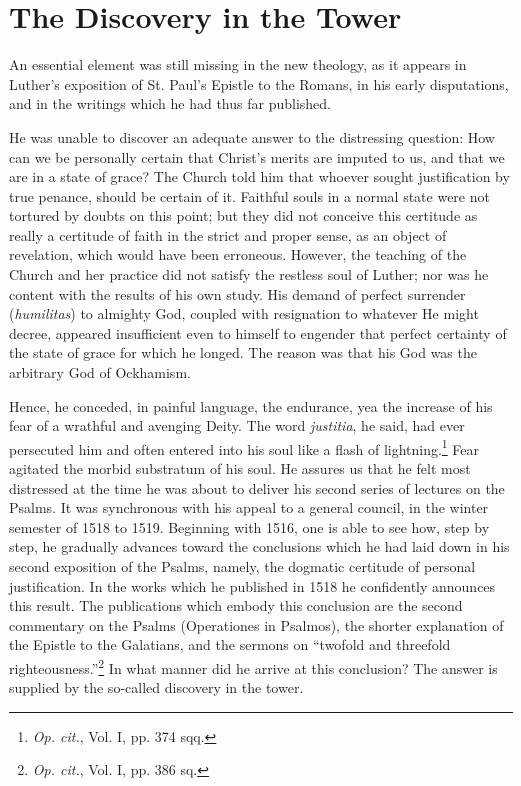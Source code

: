 \section{The Discovery in the Tower}

An essential element was still missing in the new theology, as it
appears in Luther’s exposition of St. Paul’s Epistle to the Romans, in
his early disputations, and in the writings which he had thus far published.

He was unable to discover an adequate answer to the distressing
question: How can we be personally certain that Christ’s merits are
imputed to us, and that we are in a state of grace? The Church told
him that whoever sought justification by true penance, should be
certain of it. Faithful souls in a normal state were not tortured by
doubts on this point; but they did not conceive this certitude as
really a certitude of faith in the strict and proper sense, as an
object of revelation, which would have been erroneous. However,
the teaching of the Church and her practice did not satisfy the restless
soul of Luther; nor was he content with the results of his own
study. His demand of perfect surrender (\textit{humilitas}) to almighty
God, coupled with resignation to whatever He might decree, appeared insufficient
even to himself to engender that perfect certainty
of the state of grace for which he longed. The reason was that his
God was the arbitrary God of Ockhamism.

Hence, he conceded, in painful language, the endurance, yea the
increase of his fear of a wrathful and avenging Deity. The word
\textit{justitia}, he said, had ever persecuted him and often entered into his
soul like a flash of lightning.\footnote{\textit{Op. cit.}, Vol. I, pp. 374 sqq.}
Fear agitated the morbid substratum
of his soul. He assures us that he felt most distressed at the time he
was about to deliver his second series of lectures on the Psalms. It
was synchronous with his appeal to a general council, in the winter
semester of 1518 to 1519. Beginning with 1516, one is able to see
how, step by step, he gradually advances toward the conclusions
which he had laid down in his second exposition of the Psalms,
namely, the dogmatic certitude of personal justification. In the
works which he published in 1518 he confidently announces this
result. The publications which embody this conclusion are the second
commentary on the Psalms (Operationes in Psalmos), the shorter
explanation of the Epistle to the Galatians, and the sermons on “twofold
and threefold righteousness.”\footnote{\textit{Op. cit.}, Vol. I, pp. 386 sq.}
In what manner did he arrive
at this conclusion? The answer is supplied by the so-called discovery
in the tower.

